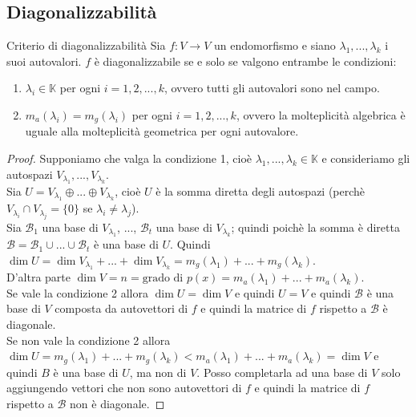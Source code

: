 \documentclass[a4paper]{article}
\theoremstyle{definition}
\begin{document}
	\subsection{Diagonalizzabilità}

	\begin{teo}{Criterio di diagonalizzabilità}{}
		Sia $f: V \to V$ un endomorfismo e siano $\lambda_1, ..., \lambda_k$ i suoi autovalori.
		$f$ è diagonalizzabile se e solo se valgono entrambe le condizioni:
		\begin{enumerate}
			\item $\lambda_i \in \mathbb{K}$ per ogni $i = 1, 2, ..., k$, ovvero tutti gli autovalori sono nel campo.
			\item $m_a(\lambda_i) = m_g(\lambda_i)$ per ogni $i = 1, 2, ..., k$, ovvero la molteplicità algebrica è uguale alla molteplicità geometrica per ogni autovalore.
		\end{enumerate}
	\end{teo}

	\begin{proof}
		Supponiamo che valga la condizione 1, cioè $\lambda_1, ..., \lambda_k \in \mathbb{K}$ e consideriamo gli autospazi $V_{\lambda_1}, ..., V_{\lambda_k}$. \\
		Sia $U = V_{\lambda_1} \oplus ... \oplus V_{\lambda_k}$, cioè $U$ è la somma diretta degli autospazi (perchè $V_{\lambda_i} \cap V_{\lambda_j} = \{0\}$ se $\lambda_i \ne \lambda_j$). \\
		Sia $\mathcal{B}_1$ una base di $V_{\lambda_1}$, ..., $\mathcal{B}_t$ una base di $V_{\lambda_k}$;
		quindi poichè la somma è diretta $\mathcal{B} = \mathcal{B}_1 \cup ... \cup \mathcal{B}_t$ è una base di $U$.
		Quindi $\dim U = \dim V_{\lambda_1} + ... + \dim V_{\lambda_k} = m_g(\lambda_1) + ... + m_g(\lambda_k)$. \\
		D'altra parte $\dim V = n = \text{grado di } p(x) = m_a(\lambda_1) + ... + m_a(\lambda_k)$. \\
		Se vale la condizione 2 allora $\dim U = \dim V$ e quindi $U = V$ e quindi $\mathcal{B}$ è una base di $V$ composta da autovettori di $f$ e quindi la matrice di $f$ rispetto a $\mathcal{B}$ è diagonale. \\
		Se non vale la condizione 2 allora $\dim U = m_g(\lambda_1) + ... + m_g(\lambda_k) < m_a(\lambda_1) + ... + m_a(\lambda_k) = \dim V$ e quindi $B$ è una base di $U$, ma non di $V$.
		Posso completarla ad una base di $V$ solo aggiungendo vettori che non sono autovettori di $f$ e quindi la matrice di $f$ rispetto a $\mathcal{B}$ non è diagonale.
	\end{proof}
\end{document}
